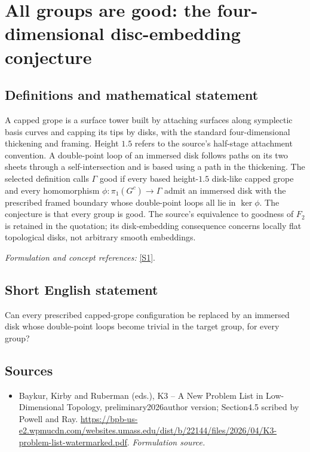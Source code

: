 \documentclass[11pt]{article}
\begin{document}
\section*{\texorpdfstring{All groups are good: the four-dimensional disc-embedding conjecture}{All groups are good: the four-dimensional disc-embedding conjecture}}\label{30006816}
\subsection{Definitions and mathematical statement}
A capped grope is a surface tower built by attaching surfaces along symplectic basis curves and capping its tips by disks, with the standard four-dimensional thickening and framing. Height $1.5$ refers to the source's half-stage attachment convention. A double-point loop of an immersed disk follows paths on its two sheets through a self-intersection and is based using a path in the thickening. The selected definition calls $\Gamma$ good if every based height-$1.5$ disk-like capped grope and every homomorphism
$\phi:\pi_1(G^c)\to\Gamma$ admit an immersed disk with the prescribed framed boundary whose double-point loops all lie in $\ker\phi$. The conjecture is that every group is good. The source's equivalence to goodness of $F_2$ is retained in the quotation; its disk-embedding consequence concerns locally flat topological disks, not arbitrary smooth embeddings.
\par\smallskip\textit{Formulation and concept references:} \href{https://bpb-us-e2.wpmucdn.com/websites.umass.edu/dist/b/22144/files/2026/04/K3-problem-list-watermarked.pdf}{[S1]}.

\subsection{Short English statement}
Can every prescribed capped-grope configuration be replaced by an immersed disk whose double-point loops become trivial in the target group, for every group?
\subsection{Sources}
\begin{itemize}
\item[S1]Baykur, Kirby and Ruberman (eds.), K3 – A New Problem List in Low-Dimensional Topology, preliminary2026author version; Section4.5 scribed by Powell and Ray.
\url{https://bpb-us-e2.wpmucdn.com/websites.umass.edu/dist/b/22144/files/2026/04/K3-problem-list-watermarked.pdf}.
\textit{Formulation source.}
\end{itemize}
\end{document}
